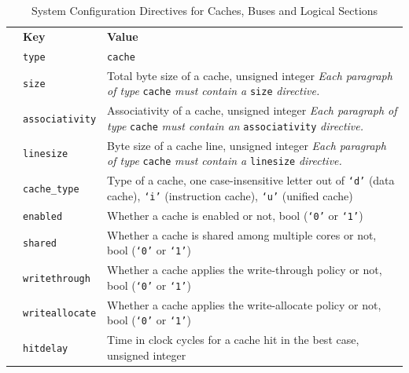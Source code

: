 \newpage

\begin{table}[t]
  \begin{center}
    \caption{System Configuration Directives for Caches, Buses and Logical Sections}
    \label{tab:sysconf2}
    \begin{tabular}{|p{15mm}|p{33mm}|p{11.3cm}|}
      \hline
      & \textbf{Key} & \textbf{Value} \\
      \hhline{|=|=|=|}
      \multirow{13}{*}{\shortstack[l]{\textbf{Caches}}}  & \small\texttt{type} & \small\texttt{cache} \\
      \hhline{|~|-|-|}
      & \small\texttt{size} & Total byte size of a cache, unsigned integer \newline \textit{Each paragraph of type} \texttt{\small cache} \textit{must contain a} \texttt{\small size} \textit{directive.} \\
      \hhline{|~|-|-|}
      & \small\texttt{associativity} & Associativity of a cache, unsigned integer \newline \textit{Each paragraph of type} \texttt{\small cache} \textit{must contain an} \texttt{\small associativity} \textit{directive.} \\
      \hhline{|~|-|-|}
      & \small\texttt{linesize} & Byte size of a cache line, unsigned integer \newline \textit{Each paragraph of type} \texttt{\small cache} \textit{must contain a} \texttt{\small linesize} \textit{directive.} \\
      \hhline{|~|-|-|}
      & \small\texttt{cache\_type} & Type of a cache, one case-insensitive letter out of \texttt{`d'} (data cache), \texttt{`i'} (instruction cache), \texttt{`u'} (unified cache) \\
      \hhline{|~|-|-|}
      & \small\texttt{enabled} & Whether a cache is enabled or not, bool (\texttt{`0'} or \texttt{`1'}) \\
      \hhline{|~|-|-|}
      & \small\texttt{shared} & Whether a cache is shared among multiple cores or not, bool (\texttt{`0'} or \texttt{`1'}) \\
      \hhline{|~|-|-|}
      & \small\texttt{writethrough} & Whether a cache applies the write-through policy or not, bool (\texttt{`0'} or \texttt{`1'}) \\
      \hhline{|~|-|-|}
      & \small\texttt{writeallocate} & Whether a cache applies the write-allocate policy or not, bool (\texttt{`0'} or \texttt{`1'}) \\
      \hhline{|~|-|-|}
      & \small\texttt{hitdelay} & Time in clock cycles for a cache hit in the best case, unsigned integer \\

\end{tabular}
\end{center}
\end{table}
